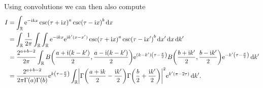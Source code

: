 \documentclass[english, parskip=full]{scrartcl}
\begin{document}
Using convolutions we can then also compute
\begin{align}
I &= \intr{\powe{-\i kx} \csc(\tau + \i x)^a \csc(\tau - \i x)^b}{x} \\
&= \intr{ \frac{1}{2\pi} \intr{ \intr{\powe{-\i kx} \powe{\i k'(x-x')} \csc(\tau + \i x)^a \csc(\tau - \i x')^b}{x'} }{x} }{k'}\\
&= \frac{2^{a+b-2}}{2\pi} \intr{ B\kla*{\frac{a+\i (k-k')}{2}, \frac{a-\i (k-k')}{2}} \powe{(k-k') \kla*{\tau - \frac{\pi}{2}}} B\kla*{\frac{b+\i k'}{2}, \frac{b-\i k'}{2}} \powe{-k' \kla*{\tau - \frac{\pi}{2}}} }{k'}\\
&= \frac{2^{a+b-2}}{2\pi \Gamma(a) \Gamma(b)} \powe{k \kla*{\tau - \frac{\pi}{2}}} \intr{\abs*{\Gamma\kla*{\frac{a+\i k}{2} - \frac{\i k'}{2}} \Gamma\kla*{\frac{b}{2} + \frac{\i k'}{2}}}^2 \powe{k' (\pi - 2\tau)}}{k'}.
\end{align}
\end{document}
